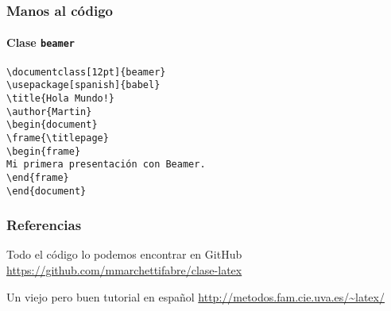 \documentclass[12pt]{beamer}
\begin{document}
\begin{frame}%
  \frametitle{Manos al código}
  \framesubtitle{Clase \texttt{beamer}}
  \begin{block}{}
    \texttt{\textbackslash documentclass[12pt]\{beamer\}\\
      \textbackslash usepackage[spanish]\{babel\}\\
      \bigskip
      \textbackslash title\{Hola Mundo!\}\\
      \textbackslash author\{Martin\}\\
      \bigskip
      \textbackslash begin\{document\}\\
      \textbackslash frame\{\textbackslash titlepage\}\\
      \bigskip
      \textbackslash begin\{frame\}\\
      Mi primera presentación con Beamer.\\
      \textbackslash end\{frame\}\\
      \bigskip
      \textbackslash end\{document\}
    }
\end{block}
\end{frame}

\begin{frame}%
  \frametitle{Referencias}
  \begin{block}{Todo el código lo podemos encontrar en GitHub}
    \url{https://github.com/mmarchettifabre/clase-latex}
  \end{block}
  \begin{block}{Un viejo pero buen tutorial en español}
    \url{http://metodos.fam.cie.uva.es/~latex/}
  \end{block}
\end{frame}
\end{document}
